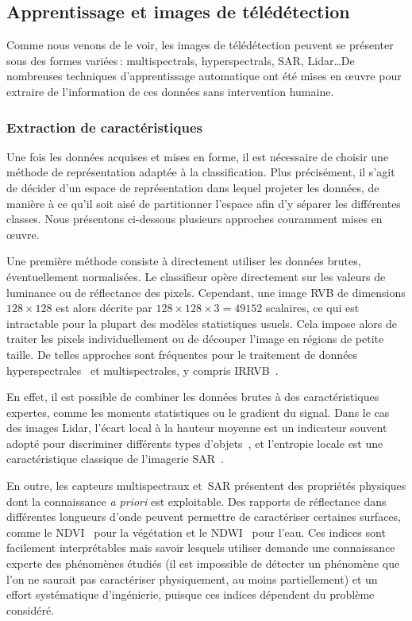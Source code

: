 \subsection{Apprentissage et images de télédétection}

Comme nous venons de le voir, les images de télédétection peuvent se présenter sous des formes variées\,: \glspl{multispectral}, \glspl{hyperspectral}, \gls{SAR}, \gls{Lidar}\dots De nombreuses techniques d'apprentissage automatique ont été mises en \oe{}uvre pour extraire de l'information de ces données sans intervention humaine.

\subsubsection{Extraction de caractéristiques}

Une fois les données acquises et mises en forme, il est nécessaire de choisir une méthode de représentation adaptée à la classification. Plus précisément, il s'agit de décider d'un espace de représentation dans lequel projeter les données, de manière à ce qu'il soit aisé de partitionner l'espace afin d'y séparer les différentes classes. Nous présentons ci-dessous plusieurs approches couramment mises en \oe{}uvre.

Une première méthode consiste à directement utiliser les données brutes, éventuellement normalisées. Le classifieur opère directement sur les valeurs de luminance ou de réflectance des pixels. Cependant, une image \gls{RVB} de dimensions $128\times128$ est alors décrite par $128\times128\times3 = 49152$ scalaires, ce qui est intractable pour la plupart des modèles statistiques usuels. Cela impose alors de traiter les pixels individuellement ou de découper l'image en régions de petite taille. De telles approches sont fréquentes pour le traitement de données hyperspectrales~\cite{fauvel_advances_2013,ham_investigation_2005} et multispectrales, y compris \gls{IRRVB}~\cite{dechesne_semantic_2017}.

En effet, il est possible de combiner les données brutes à des caractéristiques expertes, comme les moments statistiques ou le gradient du signal. Dans le cas des images \gls{Lidar}, l'écart local à la hauteur moyenne est un indicateur souvent adopté pour discriminer différents types d'objets~\cite{guo_relevance_2011,li_lidar_2017,guennec_classication_2018}, et l'entropie locale est une caractéristique classique de l'imagerie \gls{SAR}~\cite{g._barber_sar_1991}.

En outre, les capteurs multispectraux et \gls{SAR} présentent des propriétés physiques dont la connaissance \emph{a priori} est exploitable. Des rapports de réflectance dans différentes longueurs d'onde peuvent permettre de caractériser certaines surfaces, comme le \gls{NDVI}~\cite{rouse_monitoring_1974} pour la végétation et le \gls{NDWI}~\cite{xie_new_2014} pour l'eau. Ces indices sont facilement interprétables mais savoir lesquels utiliser demande une connaissance experte des phénomènes étudiés (il est impossible de détecter un phénomène que l'on ne saurait pas caractériser physiquement, au moins partiellement) et un effort systématique d'ingénierie, puisque ces indices dépendent du problème considéré.

